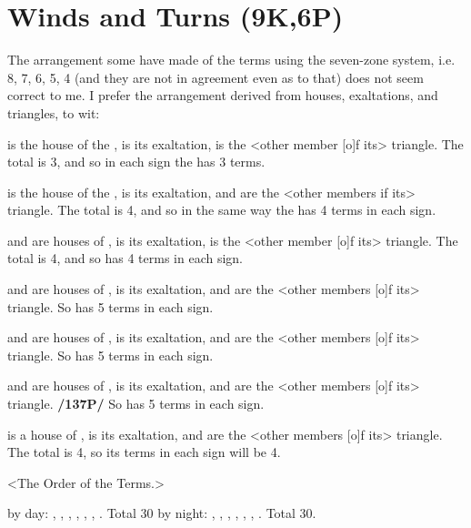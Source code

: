 \section{Winds and Turns (9K,6P)}

The arrangement some have made of the terms using the seven-zone system, i.e. 8, 7, 6, 5, 4 (and they are not in agreement even as to that) does not seem correct to me. I prefer the arrangement derived from houses, exaltations, and triangles, to wit:

\Leo\xspace is the house of the \Sun, \Aries\xspace is its exaltation, \Sagittarius\xspace is the <other member [o]f its> triangle. The total is 3, and so in each sign the \Sun\xspace has 3 terms.

\Cancer\xspace is the house of the \Moon, \Taurus\xspace is its exaltation, \Virgo\xspace and \Capricorn\xspace are the <other members if its> triangle. The total is 4, and so in the same way the \Moon has 4 terms in each sign.

\Capricorn\xspace and \Aquarius\xspace are houses of \Saturn, \Libra is its exaltation, \Gemini\xspace is the <other member [o]f its> triangle. The total is 4, and so \Saturn\xspace has 4 terms in each sign.

\Sagittarius\xspace and \Pisces\xspace are houses of \Jupiter, \Cancer\xspace is its exaltation, \Aries\xspace and \Leo\xspace are the <other members [o]f its> triangle. So \Jupiter\xspace has 5 terms in each sign.

\Aries\xspace and \Scorpio\xspace are houses of \Mars, \Capricorn\xspace is its exaltation, \Pisces\xspace and \Cancer\xspace are the <other members [o]f its> triangle. So \Mars\xspace has 5 terms in each sign.

\Taurus\xspace and \Libra\xspace are houses of \Venus, \Pisces\xspace is its exaltation, \Virgo\xspace and \Capricorn\xspace are the <other members [o]f its> triangle. \textbf{/137P/} So \Venus\xspace has 5 terms in each sign.

\Gemini\xspace is a house of \Mercury, \Virgo\xspace is its exaltation, \Aquarius\xspace and \Libra\xspace are the <other members [o]f its> triangle. The total is 4, so its terms in each sign will be 4.

<The Order of the Terms.>

\Aries\xspace \Leo\xspace \Sagittarius\xspace by day: , , , , , , . Total 30 by night: , , , , , , . Total 30.

